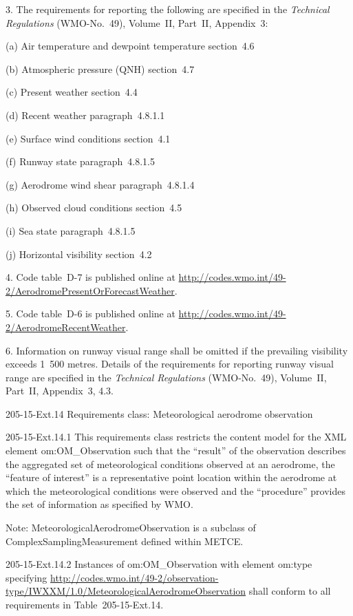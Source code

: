 3. The requirements for reporting the following are specified in the \emph{Technical Regulations} (WMO-No.~49), Volume~II, Part~II, Appendix~3:

(a) Air temperature and dewpoint temperature section~4.6

(b) Atmospheric pressure (QNH) section~4.7

(c) Present weather section~4.4

(d) Recent weather paragraph~4.8.1.1

(e) Surface wind conditions section~4.1

(f) Runway state paragraph~4.8.1.5

(g) Aerodrome wind shear paragraph~4.8.1.4

(h) Observed cloud conditions section~4.5

(i) Sea state paragraph~4.8.1.5

(j) Horizontal visibility section~4.2

4. Code table~D-7 is published online at \url{http://codes.wmo.int/49-2/AerodromePresentOrForecastWeather}.

5. Code table~D-6 is published online at \url{http://codes.wmo.int/49-2/AerodromeRecentWeather}.

6. Information on runway visual range shall be omitted if the prevailing visibility exceeds 1~500 metres. Details of the requirements for reporting runway visual range are specified in the \emph{Technical Regulations} (WMO-No.~49), Volume~II, Part~II, Appendix~3, 4.3.

205-15-Ext.14 Requirements class: Meteorological aerodrome observation

205-15-Ext.14.1 This requirements class restricts the content model for the XML element om:OM\_Observation such that the ``result'' of the observation describes the aggregated set of meteorological conditions observed at an aerodrome, the ``feature of interest'' is a representative point location within the aerodrome at which the meteorological conditions were observed and the ``procedure'' provides the set of information as specified by WMO.

Note: MeteorologicalAerodromeObservation is a subclass of ComplexSamplingMeasurement defined within METCE.

205-15-Ext.14.2 Instances of om:OM\_Observation with element om:type specifying \url{http://codes.wmo.int/49-2/observation-type/IWXXM/1.0/MeteorologicalAerodromeObservation} shall conform to all requirements in Table~205-15-Ext.14.

